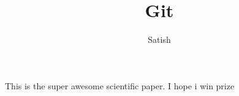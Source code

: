 \documentclass[10pt]{article}
\author{Satish}
\title{Git}
\begin{document}
	\maketitle

	This is the super awesome scientific paper.
	I hope i win prize
\end{document}
